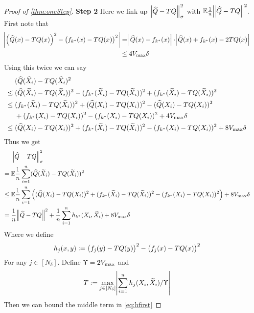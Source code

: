 \begin{proof}[Proof of \cref{thm:oneStep}]
  \textbf{Step 2} Here we link up $\norm{\widehat{Q} - TQ}_{\sigma}^2$ 
  with $\mathbb{E} \frac{1}{n} \norm{\widehat{Q} -TQ}^2$.
  First  note that
  \begin{align}
    \abs{ \left( \widehat{Q}(x) - TQ(x) \right)^2
    - \left( f_{k^*}(x) - TQ(x) \right)^2 }
    &= \abs{ \widehat{Q}(x) - f_{k^*}(x) } \cdot
    \abs{ \widehat{Q}(x) + f_{k^*}(x) - 2 TQ(x) }
    \\ & \leq 4 V_{\max} \delta
  \end{align}
  Using this twice we can say
  \begin{align}
    & (\widehat{Q}(\widehat{X}_i) - TQ(\widehat{X}_i)^2 
    \\ \leq {} & (\widehat{Q}(\widetilde{X}_i) - TQ(\widetilde{X}_i))^2
    - (f_{k^*}(\widetilde{X}_i) - TQ(\widetilde{X}_i))^2
    + (f_{k^*}(\widetilde{X}_i) - TQ(\widetilde{X}_i))^2 
    \\ \leq {} & (f_{k^*}(\widetilde{X}_i) - TQ(\widetilde{X}_i))^2 
    + (\widehat{Q}(X_i) - TQ(X_i))^2
    - (\widehat{Q}(X_i) - TQ(X_i))^2
    \notag \\ & + (f_{k^*}(X_i) - TQ(X_i))^2
    - (f_{k^*}(X_i) - TQ(X_i))^2 + 4 V_{\max} \delta
    \\ \leq {} & (\widehat{Q}(X_i) - TQ(X_i))^2
    + (f_{k^*}(\widetilde{X}_i) - TQ(\widetilde{X}_i))^2
    - (f_{k^*}(X_i) - TQ(X_i))^2
    + 8 V_{\max} \delta
    \label{eq:c2step2long1}
  \end{align}
  Thus we get
  \begin{align}
    & \norm{\widehat{Q} - TQ}_\sigma^2
    \\ = {} & \mathbb{E} \frac{1}{n} \sum_{i=1}^n (\widehat{Q}(\widetilde{X}_i) - TQ(\widetilde{X}_i))^2
    \\ \leq {} & \mathbb{E} \frac{1}{n} \sum_{i=1}^n \left( (\widehat{Q}(X_i) - TQ(X_i))^2 
      + (f_{k^*}(\widetilde{X}_i) - TQ(\widetilde{X}_i))^2
    - (f_{k^*}(X_i) - TQ(X_i))^2 \right)
    + 8 V_{\max} \delta 
    \\ = {} & \frac{1}{n} \norm{\widehat{Q} - TQ}^2
    + \frac{1}{n} \sum_{i=1}^n h_{k^*}(X_i, \widetilde{X}_i)
    + 8 V_{\max} \delta
    \label{eq:hfirst}
  \end{align}
  Where we define
  \begin{equation}
    h_j(x, y) \vcentcolon= \left( f_j(y) - TQ(y) \right)^2
    - \left( f_j(x) - TQ(x) \right)^2
    \label{eq:c2step2hdef}
  \end{equation}
  For any $j \in [N_\delta]$.
  Define $\Upupsilon = 2 V_{\max}$ and
  \begin{equation}
    T \vcentcolon= \max_{j \in [N_\delta]}
    \abs{\sum_{i=1}^n h_j(X_i, \widetilde{X}_i)/ \Upupsilon}
  \end{equation}
  Then we can bound the middle term in \cref{eq:hfirst}

\end{proof}
